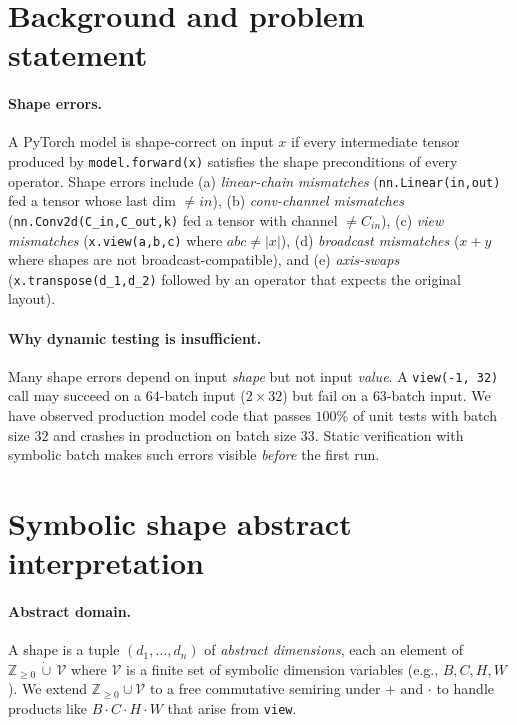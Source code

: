 \documentclass{article}
\theoremstyle{definition}
\begin{document}
\section{Background and problem statement}\label{sec:background}

\paragraph{Shape errors.} A PyTorch model is shape-correct on input
$x$ if every intermediate tensor produced by \verb|model.forward(x)|
satisfies the shape preconditions of every operator. Shape errors
include (a) \emph{linear-chain mismatches} (\verb|nn.Linear(in,out)|
fed a tensor whose last dim $\ne in$), (b) \emph{conv-channel
mismatches} (\verb|nn.Conv2d(C_in,C_out,k)| fed a tensor with channel
$\ne C_{in}$), (c) \emph{view mismatches} (\verb|x.view(a,b,c)|
where $abc\ne|x|$), (d) \emph{broadcast mismatches}
($x+y$ where shapes are not broadcast-compatible), and (e)
\emph{axis-swaps} (\verb|x.transpose(d_1,d_2)| followed by an operator
that expects the original layout).

\paragraph{Why dynamic testing is insufficient.} Many shape errors
depend on input \emph{shape} but not input \emph{value}. A
\verb|view(-1, 32)| call may succeed on a $64$-batch input
($2\!\times\!32$) but fail on a $63$-batch input. We have observed
production model code that passes $100\%$ of unit tests with batch
size $32$ and crashes in production on batch size $33$. Static
verification with symbolic batch makes such errors visible
\emph{before} the first run.

\section{Symbolic shape abstract interpretation}\label{sec:abstract}

\paragraph{Abstract domain.} A shape is a tuple
$(d_1,\ldots,d_n)$ of \emph{abstract dimensions}, each an element of
$\mathbb Z_{\ge 0}\,\dot\cup\,\mathcal V$ where $\mathcal V$ is a
finite set of symbolic dimension variables (e.g., $B,C,H,W$). We
extend $\mathbb Z_{\ge 0}\cup\mathcal V$ to a free commutative
semiring under $+$ and $\cdot$ to handle products like
$B\cdot C\cdot H\cdot W$ that arise from \verb|view|.
\end{document}
